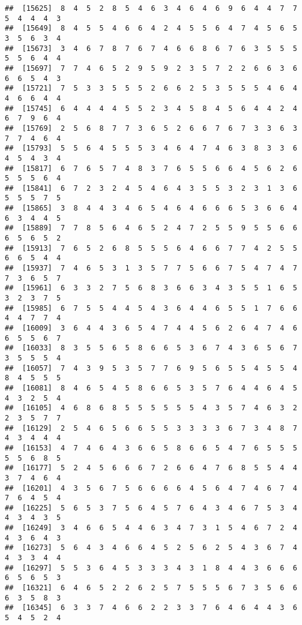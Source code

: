 \documentclass[
]{book}
\begin{document}
\begin{verbatim}
##  [15625]  8  4  5  2  8  5  4  6  3  4  6  4  6  9  6  4  4  7  7  5  4  4  4  3
##  [15649]  8  4  5  5  4  6  6  4  2  4  5  5  6  4  7  4  5  6  5  3  5  6  3  4
##  [15673]  3  4  6  7  8  7  6  7  4  6  6  8  6  7  6  3  5  5  5  5  5  6  4  4
##  [15697]  7  7  4  6  5  2  9  5  9  2  3  5  7  2  2  6  6  3  6  6  6  5  4  3
##  [15721]  7  5  3  3  5  5  5  2  6  6  2  5  3  5  5  5  4  6  4  4  6  6  4  4
##  [15745]  6  4  4  4  4  5  5  2  3  4  5  8  4  5  6  4  4  2  4  6  7  9  6  4
##  [15769]  2  5  6  8  7  7  3  6  5  2  6  6  7  6  7  3  3  6  3  7  7  4  6  4
##  [15793]  5  5  6  4  5  5  5  3  4  6  4  7  4  6  3  8  3  3  6  4  5  4  3  4
##  [15817]  6  7  6  5  7  4  8  3  7  6  5  5  6  6  4  5  6  2  6  5  5  5  6  4
##  [15841]  6  7  2  3  2  4  5  4  6  4  3  5  5  3  2  3  1  3  6  5  5  5  7  5
##  [15865]  3  8  4  4  3  4  6  5  4  6  4  6  6  6  5  3  6  6  4  6  3  4  4  5
##  [15889]  7  7  8  5  6  4  6  5  2  4  7  2  5  5  9  5  5  6  6  6  5  6  5  2
##  [15913]  7  6  5  2  6  8  5  5  5  6  4  6  6  7  7  4  2  5  5  6  6  5  4  4
##  [15937]  7  4  6  5  3  1  3  5  7  7  5  6  6  7  5  4  7  4  7  7  3  6  5  7
##  [15961]  6  3  3  2  7  5  6  8  3  6  6  3  4  3  5  5  1  6  5  3  2  3  7  5
##  [15985]  6  7  5  5  4  4  5  4  3  6  4  4  6  5  5  1  7  6  6  4  4  7  7  4
##  [16009]  3  6  4  4  3  6  5  4  7  4  4  5  6  2  6  4  7  4  6  6  5  5  6  7
##  [16033]  8  3  5  5  6  5  8  6  6  5  3  6  7  4  3  6  5  6  7  3  5  5  5  4
##  [16057]  7  4  3  9  5  3  5  7  7  6  9  5  6  5  5  4  5  5  4  8  4  5  5  5
##  [16081]  8  4  6  5  4  5  8  6  6  5  3  5  7  6  4  4  6  4  5  4  3  2  5  4
##  [16105]  4  6  8  6  8  5  5  5  5  5  5  4  3  5  7  4  6  3  2  2  3  5  7  7
##  [16129]  2  5  4  6  5  6  6  5  5  3  3  3  3  6  7  3  4  8  7  4  3  4  4  4
##  [16153]  4  7  4  6  4  3  6  6  5  8  6  6  5  4  7  6  5  5  5  5  5  6  8  5
##  [16177]  5  2  4  5  6  6  6  7  2  6  6  4  7  6  8  5  5  4  4  3  7  4  6  4
##  [16201]  4  3  5  6  7  5  6  6  6  6  4  5  6  4  7  4  6  7  4  7  6  4  5  4
##  [16225]  5  6  5  3  7  5  6  4  5  7  6  4  3  4  6  7  5  3  4  4  3  4  3  5
##  [16249]  3  4  6  6  5  4  4  6  3  4  7  3  1  5  4  6  7  2  4  4  3  6  4  3
##  [16273]  5  6  4  3  4  6  6  4  5  2  5  6  2  5  4  3  6  7  4  4  3  3  4  4
##  [16297]  5  5  3  6  4  5  3  3  3  4  3  1  8  4  4  3  6  6  6  6  5  6  5  3
##  [16321]  6  4  6  5  2  2  6  2  5  7  5  5  5  6  7  3  5  6  6  6  3  5  8  3
##  [16345]  6  3  3  7  4  6  6  2  2  3  3  7  6  4  6  4  4  3  6  5  4  5  2  4

\end{verbatim}
\end{document}
